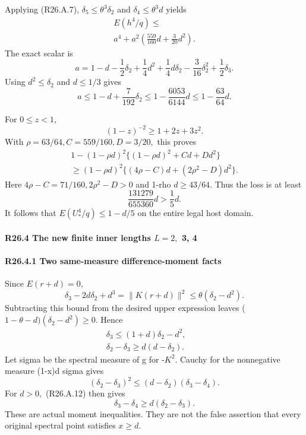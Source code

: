 Applying (R26.A.7), \(\delta_5\le \theta^3\delta_2\) and \(\delta_4\le \theta^3d\) yields
\[
\begin{gathered}
E(h^4/q)\le\\
a^4+a^2\left(\frac{559}{160}d+\frac3{20}d^2\right).
\end{gathered}\tag{R26.A.11}
\]
The exact scalar is
\[
a=1-d-\frac12\delta_2+\frac14d^2+\frac14d\delta_2-\frac3{16}\delta_2^2+\frac12\delta_3.
\]
Using \(d^2\le \delta_2\) and \(d\le 1/3\) gives
\[
a\le1-d+\frac7{192}\delta_2
\le1-\frac{6053}{6144}d
\le1-\frac{63}{64}d.
\]

For \(0\le z<1,\allowbreak \)
\[
(1-z)^{-2}\ge1+2z+3z^2.
\]
With \(\rho=63/64,\allowbreak  C=559/160,\allowbreak  D=3/20,\allowbreak \) this proves
\[
\begin{gathered}
1-(1-\rho d)^2\{(1-\rho d)^2+Cd+Dd^2\}\\
\ge(1-\rho d)^2\{(4\rho-C)d+(2\rho^2-D)d^2\}.
\end{gathered}
\]
Here \(4\rho-C=71/160,\allowbreak  2\rho^2-D>0\) and 1-rho \(d\ge 43/64.\)
Thus the loss is at least
\[
\frac{131279}{655360}d>\frac15d.
\]
It follows that \(E(U_*^4/q)\le 1-d/5\) on the entire legal host domain.


\paragraph{R26.4 The new finite inner lengths \(L=2,\allowbreak \) 3, 4}

\paragraph{R26.4.1 Two same-measure difference-moment facts}

Since \(E(r+d)=0,\allowbreak \)
\[
\delta_3-2d\delta_2+d^3=\|K(r+d)\|^2\le\theta(\delta_2-d^2).
\]
Subtracting this bound from the desired upper expression leaves
(\(1-\theta-d)(\delta_2-d^2)\ge 0.\) Hence
\[
\begin{gathered}
\delta_3\le(1+d)\delta_2-d^2,\qquad\\
\delta_2-\delta_3\ge d(d-\delta_2).
\end{gathered}\tag{R26.A.12}
\]
Let sigma be the spectral measure of g for -\(K^2.\) Cauchy for the
nonnegative measure (1-x)d sigma gives
\[
(\delta_2-\delta_3)^2\le(d-\delta_2)(\delta_3-\delta_4).
\]
For \(d>0,\allowbreak \) (R26.A.12) then gives
\[
\delta_3-\delta_4\ge d(\delta_2-\delta_3).                            \tag{R26.A.13}
\]
These are actual moment inequalities. They are not the false assertion
that every original spectral point satisfies \(x\ge d.\)

